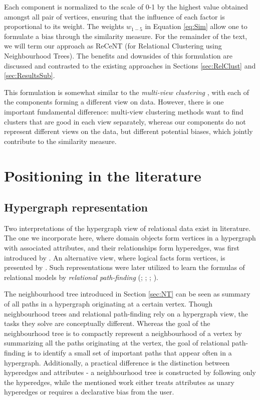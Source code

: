 	
Each component is normalized to the scale of 0-1 by the highest value obtained amongst all pair of vertices, ensuring that the influence of each factor is proportional to its weight.
The weights $w_{1-5}$ in Equation \ref{eq:Sim} allow one to formulate a bias through the similarity measure.
For the remainder of the text, we will term our approach as ReCeNT (for Relational Clustering using Neighbourhood Trees).
The benefits and downsides of this formulation are discussed and contrasted to the existing approaches in Sections \ref{sec:RelClust} and \ref{sec:ResultsSub}.


This formulation is somewhat similar to the \textit{multi-view clustering} \cite{Bickel:2004}, with each of the components forming a different view on data.
However, there is one important fundamental difference: multi-view clustering methods want to find clusters that are good in each view separately, whereas our components do not represent different views on the data, but different potential biases, which jointly contribute to the similarity measure.


\section{Positioning in the literature}


\subsection{Hypergraph representation}

Two interpretations of the hypergraph view of relational data exist in literature.
The one we incorporate here, where domain objects form vertices in a hypergraph with associated attributes, and their relationships form hyperedges, was first introduced by \cite{Richards:92AAb}.
An alternative view, where logical facts form vertices, is presented by \cite{Ong2005}.
Such representations were later utilized to learn the formulas of relational models by \textit{relational path-finding} (\cite{kok2010motifs}; \cite{Richards:92AAb}; \cite{Ong2005}; \cite{Lovasz1996}).



The neighbourhood tree introduced in Section \ref{sec:NT} can be seen as summary of all paths in a hypergraph originating at a certain vertex.
Though neighbourhood trees and relational path-finding rely on a hypergraph view, the tasks they solve are conceptually different.
Whereas the goal of the neighbourhood tree is to compactly represent a neighbourhood of a vertex by summarizing all the paths originating at the vertex, the goal of relational path-finding is to identify a small set of important paths that appear often in a hypergraph.
Additionally, a practical difference is the distinction between hyperedges and attributes - a neighbourhood tree is constructed by following only the hyperedges, while the mentioned work either treats attributes as unary hyperedges or requires a declarative bias from the user.


